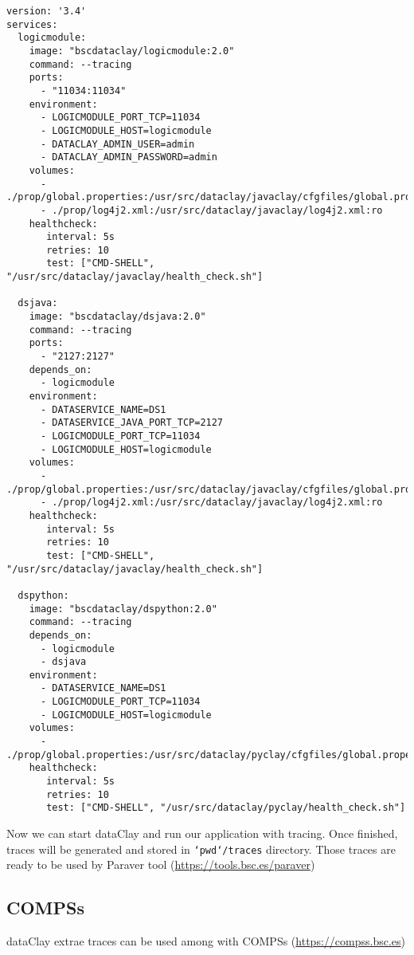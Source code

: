 \begin{tBox}
 \begin{lstlisting}[language=docker-compose-2, frame=none]
version: '3.4'
services:
  logicmodule:
    image: "bscdataclay/logicmodule:2.0"
    command: --tracing
    ports:
      - "11034:11034"
    environment:
      - LOGICMODULE_PORT_TCP=11034
      - LOGICMODULE_HOST=logicmodule
      - DATACLAY_ADMIN_USER=admin
      - DATACLAY_ADMIN_PASSWORD=admin
    volumes:
      - ./prop/global.properties:/usr/src/dataclay/javaclay/cfgfiles/global.properties:ro
      - ./prop/log4j2.xml:/usr/src/dataclay/javaclay/log4j2.xml:ro
    healthcheck:
       interval: 5s
       retries: 10
       test: ["CMD-SHELL", "/usr/src/dataclay/javaclay/health_check.sh"]
         
  dsjava:
    image: "bscdataclay/dsjava:2.0"
    command: --tracing
    ports:
      - "2127:2127"
    depends_on:
      - logicmodule
    environment:
      - DATASERVICE_NAME=DS1
      - DATASERVICE_JAVA_PORT_TCP=2127
      - LOGICMODULE_PORT_TCP=11034
      - LOGICMODULE_HOST=logicmodule
    volumes:
      - ./prop/global.properties:/usr/src/dataclay/javaclay/cfgfiles/global.properties:ro
      - ./prop/log4j2.xml:/usr/src/dataclay/javaclay/log4j2.xml:ro
    healthcheck:
       interval: 5s
       retries: 10
       test: ["CMD-SHELL", "/usr/src/dataclay/javaclay/health_check.sh"]
       
  dspython:
    image: "bscdataclay/dspython:2.0"
    command: --tracing
    depends_on:
      - logicmodule
      - dsjava
    environment:
      - DATASERVICE_NAME=DS1
      - LOGICMODULE_PORT_TCP=11034
      - LOGICMODULE_HOST=logicmodule
    volumes:
      - ./prop/global.properties:/usr/src/dataclay/pyclay/cfgfiles/global.properties:ro
    healthcheck:
       interval: 5s
       retries: 10
       test: ["CMD-SHELL", "/usr/src/dataclay/pyclay/health_check.sh"]
 \end{lstlisting}
\end{tBox}

Now we can start dataClay and run our application with tracing. Once finished, traces will be generated and stored in \texttt{`pwd`/traces} directory. 
Those traces are ready to be used by Paraver tool (\href {https://tools.bsc.es/paraver} {https://tools.bsc.es/paraver})

\subsection{COMPSs}

dataClay extrae traces can be used among with COMPSs (\href {https://compss.bsc.es} {https://compss.bsc.es}) 

